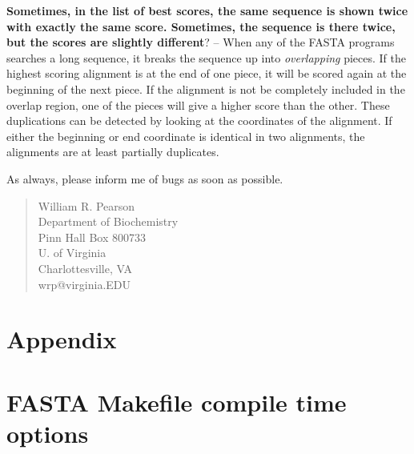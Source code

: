 \documentclass[11pt]{article}
\begin{document}
\vspace{0.5ex}
{\noindent}\textbf{Sometimes, in the list of best scores, the same sequence is
  shown twice with exactly the same score.  Sometimes, the sequence is
  there twice, but the scores are slightly different}? -- When any of
the FASTA programs searches a long sequence, it breaks the sequence up
into \emph{overlapping} pieces.  If the highest scoring alignment is
at the end of one piece, it will be scored again at the beginning of
the next piece.  If the alignment is not be completely included in the
overlap region, one of the pieces will give a higher score than the
other.  These duplications can be detected by looking at the
coordinates of the alignment.  If either the beginning or end
coordinate is identical in two alignments, the alignments are at least
partially duplicates.

\vspace{2ex}
As always, please inform me of bugs as soon as possible.

\begin{quote}
William R. Pearson\\
Department of Biochemistry\\
Pinn Hall Box 800733\\
U. of Virginia\\
Charlottesville, VA\\
wrp@virginia.EDU
\end{quote}




\appendix
\section*{Appendix}

\section{FASTA Makefile compile time options}
\end{document}
